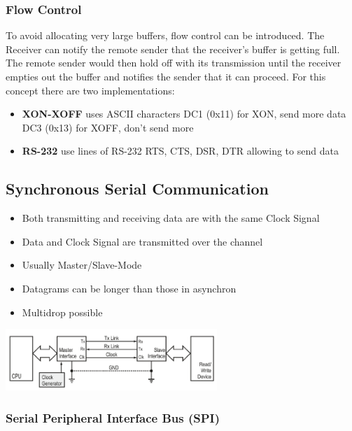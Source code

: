 \subsubsection{Flow Control}
To avoid allocating very large buffers, flow control can be introduced.
The Receiver can notify the remote sender that the receiver's buffer is getting full.
The remote sender would then hold off with its transmission until the receiver empties out the buffer and notifies the sender that it can proceed.
For this concept there are two implementations:
\begin{itemize}
	\item \textbf{XON-XOFF} uses ASCII characters
	\subitem DC1 (0x11) for XON, send more data
	\subitem DC3 (0x13) for XOFF, don't send more
	\item \textbf{RS-232} use lines of RS-232
	\subitem RTS, CTS, DSR, DTR allowing to send data
\end{itemize}
\subsection{Synchronous Serial Communication }
\begin{minipage}{11cm}
	\begin{itemize}
		\item Both transmitting and receiving data are with the same Clock Signal
		\item Data and Clock Signal are transmitted over the channel
		\item Usually Master/Slave-Mode
		\item Datagrams can be longer than those in asynchron
		\item Multidrop possible
	\end{itemize}
\end{minipage}
\begin{minipage}{8cm}
	\includegraphics[width=8cm]{images/syn.png}
\end{minipage}
\clearpage
\pagebreak
\subsubsection{Serial Peripheral Interface Bus (SPI)} 


